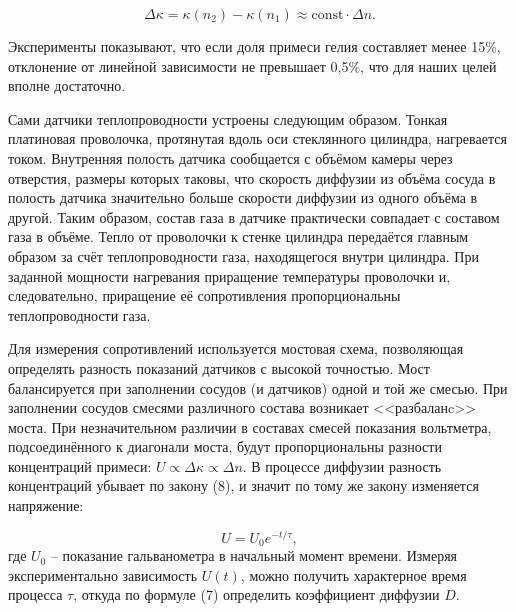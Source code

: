 \documentclass[12pt,a4paper]{article}
\begin{document}
\[ \Delta \kappa = \kappa(n_2)-\kappa(n_1)\approx\text{const}\cdot\Delta n. \]

Эксперименты показывают, что если доля примеси гелия составляет менее
15\%, отклонение от линейной зависимости не превышает 0,5\%, что для наших целей вполне достаточно.

Сами датчики теплопроводности устроены следующим образом. Тонкая платиновая проволочка, протянутая вдоль оси стеклянного цилиндра, нагревается током. Внутренняя полость датчика сообщается с объёмом камеры через отверстия, размеры которых таковы, что скорость диффузии из объёма сосуда в полость датчика значительно больше скорости диффузии из одного объёма в другой. Таким образом, состав газа в датчике практически совпадает с составом газа в объёме. Тепло от проволочки к стенке цилиндра передаётся главным образом за счёт теплопроводности газа, находящегося внутри цилиндра. При заданной мощности нагревания приращение температуры проволочки и, следовательно, приращение её сопротивления пропорциональны теплопроводности газа.

Для измерения сопротивлений используется мостовая схема, позволяющая определять разность показаний датчиков с высокой точностью. Мост балансируется при заполнении сосудов (и датчиков) одной и той же смесью. При заполнении сосудов смесями различного состава возникает <<разбаланc>> моста. При незначительном различии в составах смесей показания вольтметра, подсоединённого к диагонали моста, будут пропорциональны разности концентраций примеси: $ U\propto\Delta\kappa\propto\Delta n $. В процессе диффузии разность концентраций убывает по закону (8), и значит по тому же закону изменяется напряжение:

\begin{equation}
U=U_0e^{-t/\tau},
\end{equation}
где $ U_0 $ -- показание гальванометра в начальный момент времени. Измеряя экспериментально зависимость $ U(t) $, можно получить характерное время
процесса $ \tau $, откуда по формуле (7) определить коэффициент диффузии $ D $.
\end{document}
